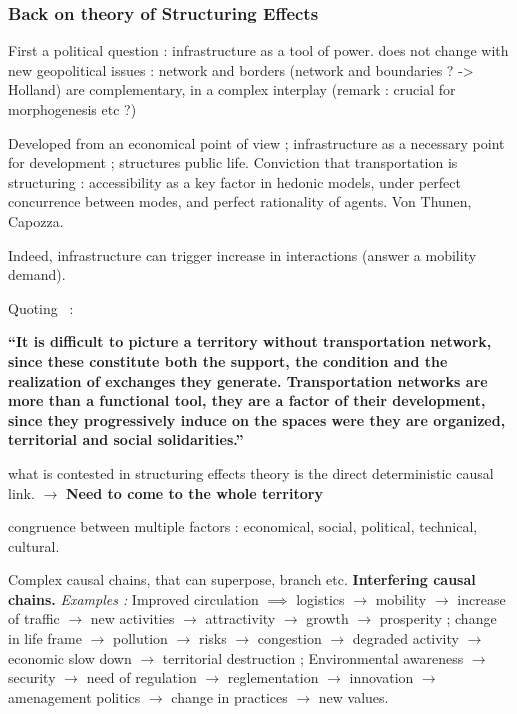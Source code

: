 \subsubsection{Back on theory of Structuring Effects}

First a political question : infrastructure as a tool of power. does not change with new geopolitical issues : network and borders (network and boundaries ? -> Holland) are complementary, in a complex interplay (remark : crucial for morphogenesis etc ?)

Developed from an economical point of view ; infrastructure as a necessary point for development ; structures public life. Conviction that transportation is structuring : accessibility as a key factor in hedonic models, under perfect concurrence between modes, and perfect rationality of agents. Von Thunen, Capozza.

Indeed, infrastructure can trigger increase in interactions (answer a mobility demand). 

Quoting~\cite{offner1996reseaux} :

\textbf{``It is difficult to picture a territory without transportation network, since these constitute both the support, the condition and the realization of exchanges they generate. Transportation networks are more than a functional tool, they are a factor of their development, since they progressively induce on the spaces were they are organized, territorial and social solidarities.''}

what is contested in structuring effects theory is the direct deterministic causal link. $\rightarrow$ \textbf{Need to come to the whole territory}

congruence between multiple factors : economical, social, political, technical, cultural.

Complex causal chains, that can superpose, branch etc. \textbf{Interfering causal chains.} \textit{Examples : } Improved circulation $\implies$ logistics $\rightarrow$ mobility $\rightarrow$ increase of traffic $\rightarrow$ new activities $\rightarrow$ attractivity $\rightarrow$ growth $\rightarrow$ prosperity ; change in life frame $\rightarrow$ pollution $\rightarrow$ risks $\rightarrow$ congestion $\rightarrow$ degraded activity $\rightarrow$ economic slow down $\rightarrow$ territorial destruction ; Environmental awareness $\rightarrow$ security $\rightarrow$ need of regulation $\rightarrow$ reglementation $\rightarrow$ innovation $\rightarrow$ amenagement politics $\rightarrow$ change in practices $\rightarrow$ new values.


